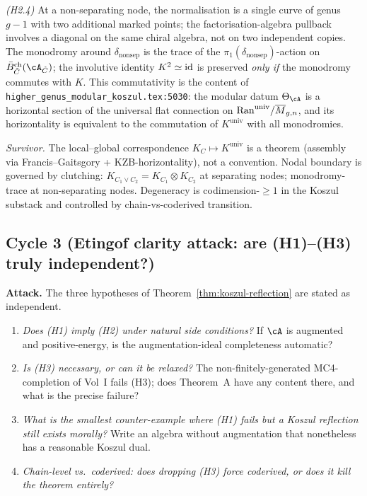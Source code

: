 \emph{(H2.4)} At a non-separating node, the normalisation is a single
curve of genus $g-1$ with two additional marked points; the
factorisation-algebra pullback involves a diagonal on the same
chiral algebra, not on two independent copies. The monodromy around
$\delta_{\mathrm{nonsep}}$ is the trace of the
$\pi_{1}(\delta_{\mathrm{nonsep}})$-action on
$\Bbarch_{\tilde C}(\cA_{\tilde C})$; the involutive identity
$K^{2}\simeq\mathrm{id}$ is preserved \emph{only if} the monodromy commutes
with $K$. This commutativity is the content of
\texttt{higher\_genus\_modular\_koszul.tex:5030}: the modular datum
$\Theta_{\cA}$ is a horizontal section of the universal flat
connection on $\mathrm{Ran}^{\mathrm{univ}}/\overline{M}_{g,n}$, and its horizontality
is equivalent to the commutation of $K^{\mathrm{univ}}$ with all
monodromies.

\emph{Survivor.} The local--global correspondence $K_{C}\mapsto
K^{\mathrm{univ}}$ is a theorem (assembly via
Francis--Gaitsgory + KZB-horizontality), not a convention. Nodal
boundary is governed by clutching:
$K_{C_{1}\vee C_{2}} = K_{C_{1}}\otimes K_{C_{2}}$ at separating nodes;
monodromy-trace at non-separating nodes. Degeneracy is
codimension-$\geq 1$ in the Koszul substack and controlled by
chain-vs-coderived transition.

\subsection*{Cycle 3 (Etingof clarity attack: are (H1)--(H3) truly independent?)}

\textbf{Attack.} The three hypotheses of
Theorem~\ref{thm:koszul-reflection} are stated as independent.

\begin{enumerate}
\item[Q3.1] \emph{Does (H1) imply (H2) under natural side
conditions?} If $\cA$ is augmented and positive-energy, is the
augmentation-ideal completeness automatic?
\item[Q3.2] \emph{Is (H3) necessary, or can it be relaxed?} The
non-finitely-generated MC4-completion of Vol~I fails (H3); does
Theorem~A have any content there, and what is the precise failure?
\item[Q3.3] \emph{What is the smallest counter-example where (H1)
fails but a Koszul reflection still exists morally?} Write an
algebra without augmentation that nonetheless has a reasonable
Koszul dual.
\item[Q3.4] \emph{Chain-level vs.\ coderived: does dropping (H3) force
coderived, or does it kill the theorem entirely?}
\end{enumerate}

